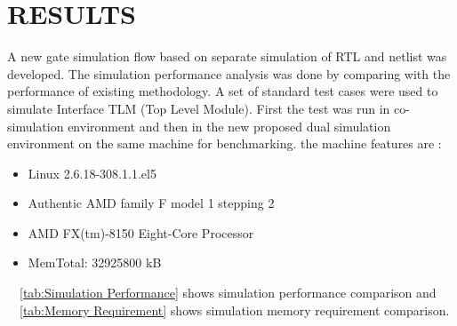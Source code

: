 \chapter{RESULTS}
\label{chap:results.tex}
A new gate simulation flow based on separate simulation of RTL and netlist was developed. The simulation performance analysis was done by comparing with the performance of existing methodology. A set of standard test cases were used to simulate Interface TLM (Top Level Module). First the test was run in co-simulation environment and then in the new proposed dual simulation environment on the same machine for benchmarking. the machine features are :
\begin{itemize}
\item Linux 2.6.18-308.1.1.el5
\item Authentic AMD family F model 1 stepping 2
\item AMD FX(tm)-8150 Eight-Core Processor
\item MemTotal:     32925800 kB
\end{itemize}  

~\tablename{~\ref{tab:Simulation Performance}} shows simulation performance comparison and ~\tablename{~\ref{tab:Memory Requirement}} shows simulation memory requirement comparison.


\newpage
